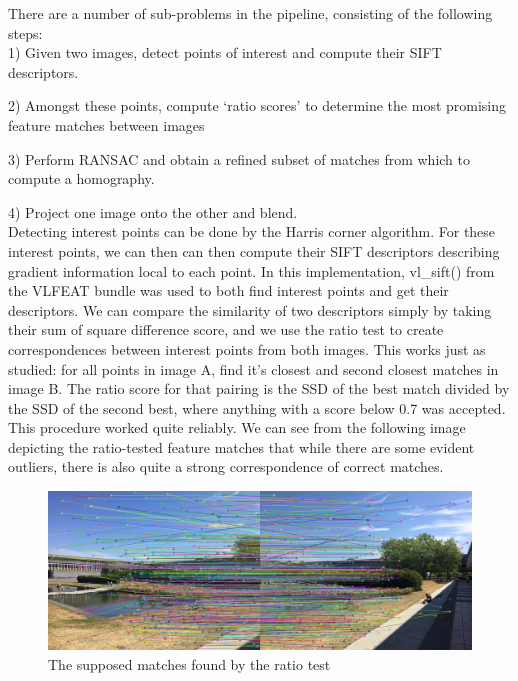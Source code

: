 \documentclass[]{article}
\begin{document}
\noindent There are a number of sub-problems in the pipeline, consisting of the following steps: \\

1) Given two images, detect points of interest and compute their SIFT descriptors.

2) Amongst these points, compute ‘ratio scores’ to determine the most promising feature matches between images

3) Perform RANSAC and obtain a refined subset of matches from which to compute a homography.

4) Project one image onto the other and blend. \\

Detecting interest points can be done by the Harris corner algorithm. For these interest points, we can then can then compute their SIFT descriptors describing gradient information local to each point. In this implementation, vl{\_}sift() from the VLFEAT bundle was used to both find interest points and get their descriptors. We can compare the similarity of two descriptors simply by taking their sum of square difference score, and we use the ratio test to create correspondences between interest points from both images. This works just as studied: for all points in image A, find it's closest and second closest matches in image B. The ratio score for that pairing is the SSD of the best match divided by the SSD of the second best, where anything with a score below 0.7 was accepted. This procedure worked quite reliably. We can see from the following image depicting the ratio-tested feature matches that while there are some evident outliers, there is also quite a strong correspondence of correct matches.

\begin{figure}[h]
	\includegraphics[scale=0.55]{results/p1_noblend/2}
	\centering
	\caption{The supposed matches found by the ratio test}
\end{figure}
\end{document}
